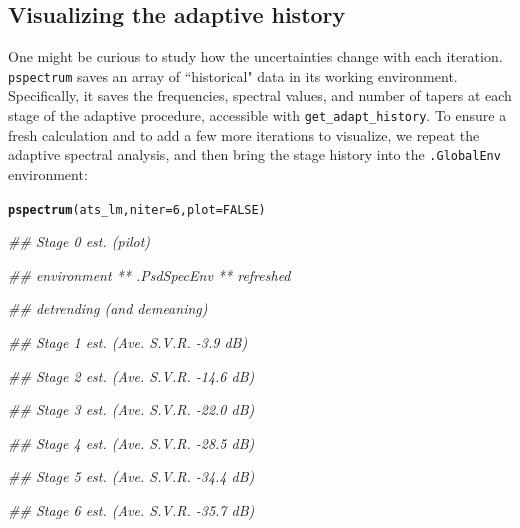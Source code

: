 \documentclass{article}\usepackage{graphicx, color}
\makeatletter
\newcommand{\hlfunctioncall}[1]{\textcolor[rgb]{0.501960784313725,0,0.329411764705882}{\textbf{#1}}}%
\newenvironment{kframe}{%
 \def\at@end@of@kframe{}%
 \ifinner\ifhmode%
  \def\at@end@of@kframe{\end{minipage}}%
  \begin{minipage}{\columnwidth}%
 \fi\fi%
 \def\FrameCommand##1{\hskip\@totalleftmargin \hskip-\fboxsep
 \colorbox{shadecolor}{##1}\hskip-\fboxsep
     \hskip-\linewidth \hskip-\@totalleftmargin \hskip\columnwidth}%
 \MakeFramed {\advance\hsize-\width
   \@totalleftmargin\z@ \linewidth\hsize
   \@setminipage}}%
 {\par\unskip\endMakeFramed%
 \at@end@of@kframe}
\newenvironment{knitrout}{}{} %
\newcommand{\Rcmd}[1]{\texttt{#1}}
\makeatother
\begin{document}
\subsection{Visualizing the adaptive history}
One might be curious to study how the
uncertainties change with each iteration.
\Rcmd{pspectrum}
 saves an array of ``historical" data in its working environment.
 Specifically, it saves the frequencies,
 spectral values, and number of tapers at each stage of the adaptive
 procedure, accessible with \Rcmd{get\_adapt\_history}.
 To ensure a fresh calculation and to 
 add a few more iterations to visualize, 
we repeat the adaptive spectral analysis, 
and then bring the stage history into the \Rcmd{.GlobalEnv} environment:
\begin{knitrout}
\color{fgcolor}\begin{kframe}
\begin{alltt}
\hlfunctioncall{pspectrum}(ats_lm, niter = 6, plot = FALSE)
\end{alltt}


{\ttfamily\noindent\itshape\textcolor{messagecolor}{\#\# Stage  0 est. (pilot)}}

{\ttfamily\noindent\itshape\textcolor{messagecolor}{\#\# 	environment  ** .PsdSpecEnv **  refreshed}}

{\ttfamily\noindent\itshape\textcolor{messagecolor}{\#\# detrending (and demeaning)}}

{\ttfamily\noindent\itshape\textcolor{messagecolor}{\#\# Stage  1 est. (Ave. S.V.R. -3.9 dB)}}

{\ttfamily\noindent\itshape\textcolor{messagecolor}{\#\# Stage  2 est. (Ave. S.V.R. -14.6 dB)}}

{\ttfamily\noindent\itshape\textcolor{messagecolor}{\#\# Stage  3 est. (Ave. S.V.R. -22.0 dB)}}

{\ttfamily\noindent\itshape\textcolor{messagecolor}{\#\# Stage  4 est. (Ave. S.V.R. -28.5 dB)}}

{\ttfamily\noindent\itshape\textcolor{messagecolor}{\#\# Stage  5 est. (Ave. S.V.R. -34.4 dB)}}

{\ttfamily\noindent\itshape\textcolor{messagecolor}{\#\# Stage  6 est. (Ave. S.V.R. -35.7 dB)}}


\end{kframe}
\end{knitrout}
\end{document}

